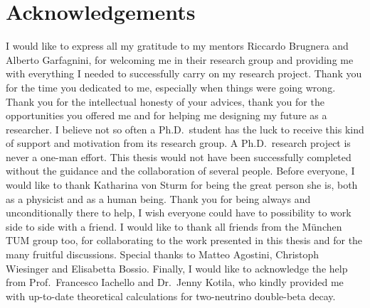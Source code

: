 
\chapter*{Acknowledgements}

I would like to express all my gratitude to my mentors Riccardo Brugnera and Alberto
Garfagnini, for welcoming me in their research group and providing me with everything I
needed to successfully carry on my research project. Thank you for the time you dedicated
to me, especially when things were going wrong. Thank you for the intellectual honesty of
your advices, thank you for the opportunities you offered me and for helping me designing
my future as a researcher. I believe not so often a Ph.D.~student has the luck to receive
this kind of support and motivation from its research group.
\newpar
A Ph.D.~research project is never a one-man effort. This thesis would not have been
successfully completed without the guidance and the collaboration of several people.
Before everyone, I would like to thank Katharina von Sturm for being the great person she
is, both as a physicist and as a human being. Thank you for being always and
unconditionally there to help, I wish everyone could have to possibility to work side to
side with a friend. I would like to thank all friends from the M\"unchen TUM group too,
for collaborating to the work presented in this thesis and for the many fruitful
discussions.  Special thanks to Matteo Agostini, Christoph Wiesinger and Elisabetta
Bossio.
\newpar
Finally, I would like to acknowledge the help from Prof.~Francesco Iachello and Dr.~Jenny
Kotila, who kindly provided me with up-to-date theoretical calculations for two-neutrino
double-beta decay.

\chapendgliph{}

